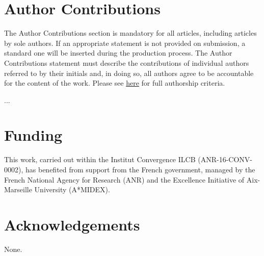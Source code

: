 \documentclass[utf8]{template/frontiersSCNS} %
\begin{document}
\section*{Author Contributions}

\color{blue}

The Author Contributions section is mandatory for all articles, including articles by sole authors. If an appropriate statement is not provided on submission, a standard one will be inserted during the production process. The Author Contributions statement must describe the contributions of individual authors referred to by their initials and, in doing so, all authors agree to be accountable for the content of the work. Please see  \href{http://home.frontiersin.org/about/author-guidelines#AuthorandContributors}{here} for full authorship criteria.

\color{black}

...

\section*{Funding}


This work, carried out within the Institut Convergence ILCB (ANR-16-CONV-0002), has benefited from support from the French government, managed by the French National Agency for Research (ANR) and the Excellence Initiative of Aix-Marseille University (A*MIDEX).

\section*{Acknowledgements}

None.


\end{document}
